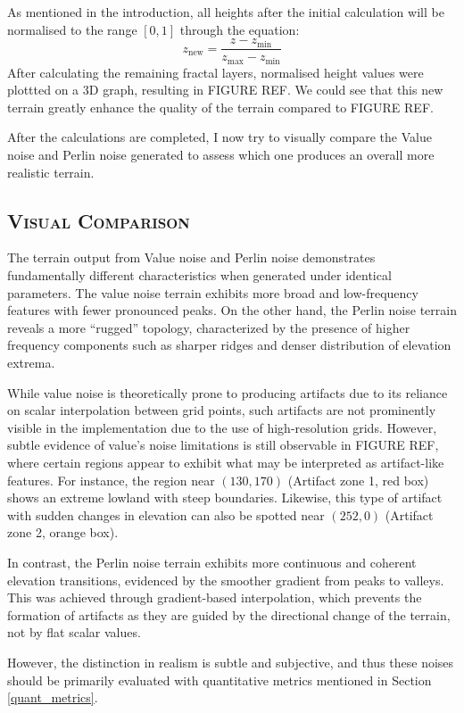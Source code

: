 As mentioned in the introduction, all heights after the initial calculation will be normalised to the range $[0,1]$ through the equation:
\[z_{\text{new}}=\frac{z-z_{\text{min}}}{z_{\text{max}}-z_{\text{min}}}\]
After calculating the remaining fractal layers, normalised height values were plottted on a 3D graph, resulting in FIGURE REF. We could see that this
new terrain greatly enhance the quality of the terrain compared to FIGURE REF. 

After the calculations are completed, I now try to visually compare the Value noise and Perlin noise generated to assess which one produces an overall 
more realistic terrain.

\subsection{\textsc{Visual Comparison}}
\vspace*{-10pt}
The terrain output from Value noise and Perlin noise demonstrates fundamentally different characteristics when generated under identical parameters. 
The value noise terrain exhibits more broad and low-frequency features with fewer pronounced peaks. On the other hand, the Perlin noise terrain reveals 
a more “rugged” topology, characterized by the presence of higher frequency components such as sharper ridges and denser distribution of elevation extrema.  

While value noise is theoretically prone to producing artifacts due to its reliance on scalar interpolation between grid points, such artifacts are not 
prominently visible in the implementation due to the use of high-resolution grids. However, subtle evidence of value's noise limitations is still observable 
in FIGURE REF, where certain regions appear to exhibit what may be interpreted as artifact-like features. For instance, the region near $(130,170)$ (Artifact 
zone 1, red box) shows an extreme lowland with steep boundaries. Likewise, this type of artifact with sudden changes in elevation can also be spotted near 
$(252,0)$ (Artifact zone 2, orange box). 

In contrast, the Perlin noise terrain exhibits more continuous and coherent elevation transitions, evidenced by the smoother gradient from peaks to valleys. 
This was achieved through gradient-based interpolation, which prevents the formation of artifacts as they are guided by the directional change of the terrain, 
not by flat scalar values. 

However, the distinction in realism is subtle and subjective, and thus these noises should be primarily evaluated with quantitative metrics mentioned in Section \ref{quant_metrics}. 

